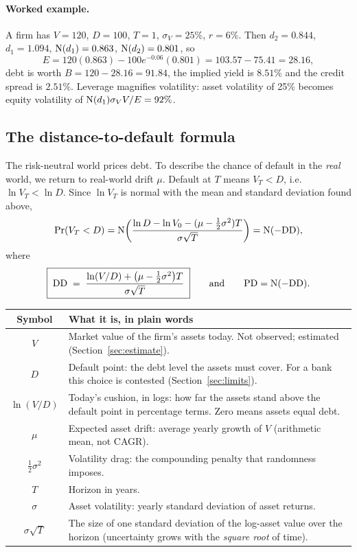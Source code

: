 \paragraph{Worked example.} A firm has $V=120$, $D=100$, $T=1$, $\sigma_V=25\%$, $r=6\%$. Then $d_2=0.844$, $d_1=1.094$, $\mathrm{N}(d_1)=0.863$, $\mathrm{N}(d_2)=0.801$, so
\[
E=120(0.863)-100e^{-0.06}(0.801)=103.57-75.41=28.16,
\]
debt is worth $B=120-28.16=91.84$, the implied yield is $8.51\%$ and the credit spread is $2.51\%$. Leverage magnifies volatility: asset volatility of 25\% becomes equity volatility of $\mathrm{N}(d_1)\sigma_VV/E=92\%$.

\subsection{The distance-to-default formula}
\label{sec:dd}
The risk-neutral world prices debt. To describe the chance of default in the \emph{real} world, we return to real-world drift $\mu$. Default at $T$ means $V_T<D$, i.e.\ $\ln V_T<\ln D$. Since $\ln V_T$ is normal with the mean and standard deviation found above,
\[
\Pr(V_T<D)=\mathrm{N}\!\left(\frac{\ln D-\ln V_0-(\mu-\tfrac12\sigma^2)T}{\sigma\sqrt T}\right)=\mathrm{N}(-\mathrm{DD}),
\]
where
\begin{equation}
\boxed{\;\mathrm{DD} \;=\; \frac{\ln(V/D)+\big(\mu-\tfrac12\sigma^2\big)T}{\sigma\sqrt T}\;}
\qquad\text{and}\qquad \mathrm{PD}=\mathrm{N}(-\mathrm{DD}).
\label{eq:dd}
\end{equation}

\begin{table}[H]\centering\small
\begin{tabular}{@{}cp{11cm}@{}}\toprule
\textbf{Symbol} & \textbf{What it is, in plain words}\\\midrule
$V$ & Market value of the firm's assets today. Not observed; estimated (Section~\ref{sec:estimate}).\\
$D$ & Default point: the debt level the assets must cover. For a bank this choice is contested (Section~\ref{sec:limits}).\\
$\ln(V/D)$ & Today's cushion, in logs: how far the assets stand above the default point in percentage terms. Zero means assets equal debt.\\
$\mu$ & Expected asset drift: average yearly growth of $V$ (arithmetic mean, not CAGR).\\
$\tfrac12\sigma^2$ & Volatility drag: the compounding penalty that randomness imposes.\\
$T$ & Horizon in years.\\
$\sigma$ & Asset volatility: yearly standard deviation of asset returns.\\
$\sigma\sqrt T$ & The size of one standard deviation of the log-asset value over the horizon (uncertainty grows with the \emph{square root} of time).\\\bottomrule
\end{tabular}
\end{table}

